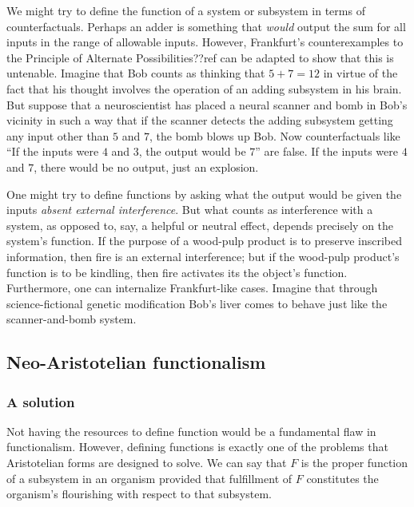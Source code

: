 We might try to define the function of a system or subsystem in terms of counterfactuals. Perhaps an adder is something that \textit{would}
output the sum for all inputs in the range of allowable inputs. However, Frankfurt's counterexamples to the Principle of Alternate
Possibilities??ref can be adapted to show that this is untenable. Imagine that Bob counts as thinking that $5+7=12$ in virtue of the 
fact that his thought involves the operation of an adding subsystem in his brain. But suppose that a neuroscientist has placed a neural
scanner and bomb in Bob's vicinity in such a way that if the scanner detects the adding subsystem getting any input other than 
$5$ and $7$, the bomb blows up Bob. Now counterfactuals like ``If the inputs were $4$ and $3$, the output would be $7$'' are false.
If the inputs were $4$ and $7$, there would be no output, just an explosion.

One might try to define functions by asking what the output would be given the inputs \textit{absent external interference}. 
But what counts as interference with a system, as opposed to, say, a helpful or neutral effect, depends precisely on the system's
function. If the purpose of a wood-pulp product is to preserve inscribed information, then fire is an external interference;
but if the wood-pulp product's function is to be kindling, then fire activates its the object's function. 
Furthermore, one can internalize Frankfurt-like cases. Imagine that through science-fictional genetic modification Bob's liver
comes to behave just like the scanner-and-bomb system. 

\subsection{Neo-Aristotelian functionalism}
\subsubsection{A solution}
Not having the resources to define function would be a fundamental flaw
in functionalism. However, defining functions is exactly one of the problems that Aristotelian forms are designed to solve.  We can say that $F$ is the proper function
of a subsystem in an organism provided that fulfillment of $F$ constitutes the organism's flourishing with respect to that subsystem.

